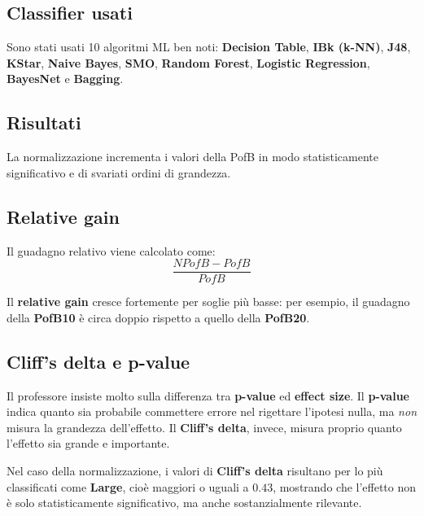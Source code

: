 \subsection{Classifier usati}

\begin{notaslide}
Sono stati usati 10 algoritmi ML ben noti: \textbf{Decision Table}, \textbf{IBk (k-NN)}, \textbf{J48}, \textbf{KStar}, \textbf{Naive Bayes}, \textbf{SMO}, \textbf{Random Forest}, \textbf{Logistic Regression}, \textbf{BayesNet} e \textbf{Bagging}.
\end{notaslide}

\subsection{Risultati}

La normalizzazione incrementa i valori della PofB in modo statisticamente significativo e di svariati ordini di grandezza.

\subsection{Relative gain}

Il guadagno relativo viene calcolato come:
\[
\frac{NPofB - PofB}{PofB}
\]

Il \textbf{relative gain} cresce fortemente per soglie più basse: per esempio, il guadagno della \textbf{PofB10} è circa doppio rispetto a quello della \textbf{PofB20}.

\subsection{Cliff's delta e p-value}

\begin{notaesame}
Il professore insiste molto sulla differenza tra \textbf{p-value} ed \textbf{effect size}. Il \textbf{p-value} indica quanto sia probabile commettere errore nel rigettare l'ipotesi nulla, ma \emph{non} misura la grandezza dell'effetto. Il \textbf{Cliff's delta}, invece, misura proprio quanto l'effetto sia grande e importante.
\end{notaesame}

\begin{notaprof}
Nel caso della normalizzazione, i valori di \textbf{Cliff's delta} risultano per lo più classificati come \textbf{Large}, cioè maggiori o uguali a \(0.43\), mostrando che l'effetto non è solo statisticamente significativo, ma anche sostanzialmente rilevante.
\end{notaprof}

